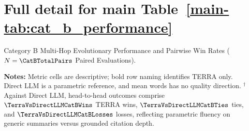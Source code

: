 \clearpage
\section{Full detail for main Table~\ref{main-tab:cat_b_performance}}
\label{detail-tab:cat_b_performance}
Category B Multi-Hop Evolutionary Performance and Pairwise Win Rates ($N=\CatBTotalPairs$ Paired Evaluations).\par\medskip
\noindent{}\par\medskip
\noindent \textbf{Notes:} Metric cells are descriptive; bold row naming identifies TERRA only. Direct LLM is a parametric reference, and mean words has no quality direction. $^\dagger$Against Direct LLM, head-to-head outcomes comprise $\TerraVsDirectLLMCatBWins$ TERRA wins, $\TerraVsDirectLLMCatBTies$ ties, and $\TerraVsDirectLLMCatBLosses$ losses, reflecting parametric fluency on generic summaries versus grounded citation depth.